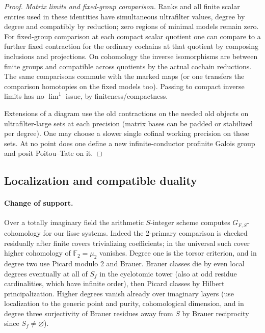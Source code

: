 \begin{proof}
\emph{Matrix limits and fixed-group comparison.}
Ranks and all finite scalar entries used in these identities have simultaneous ultrafilter values, degree by degree and compatibly by reduction; zero regions of minimal models remain zero. For fixed-group comparison at each compact scalar quotient one can compare to a further fixed contraction for the ordinary cochains at that quotient by composing inclusions and projections. On cohomology the inverse isomorphisms are between finite groups and compatible across quotients by the actual cochain reductions. The same comparisons commute with the marked maps (or one transfers the comparison homotopies on the fixed models too). Passing to compact inverse limits has no \(\lim^1\) issue, by finiteness/compactness. 

Extensions of a diagram use the old contractions on the needed old objects on ultrafilter-large sets at each precision (matrix bases can be padded or stabilized per degree). One may choose a slower single cofinal working precision on these sets. At no point does one define a new infinite-conductor profinite Galois group and posit Poitou--Tate on it.

\end{proof}

\subsection{Localization and compatible duality}

\paragraph{Change of support.}
Over a totally imaginary field the arithmetic \(S\)-integer scheme computes \(G_{F,S}\)-cohomology for our lisse systems. Indeed the 2-primary comparison is checked residually after finite covers trivializing coefficients; in the universal such cover higher cohomology of \(\mathbb F_2=\mu_2\) vanishes. Degree one is the torsor criterion, and in degree two use Picard modulo 2 and Brauer. Brauer classes die by even local degrees eventually at all of \(S_f\) in the cyclotomic tower (also at odd residue cardinalities, which have infinite order), then Picard classes by Hilbert principalization. Higher degrees vanish already over imaginary layers (use localization to the generic point and purity, cohomological dimension, and in degree three surjectivity of Brauer residues away from \(S\) by Brauer reciprocity since \(S_f\ne\varnothing\)). 

